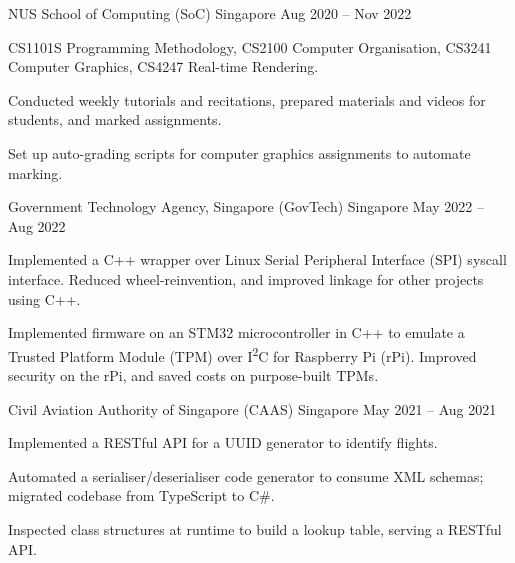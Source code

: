 \begin{cventries}
	{NUS School of Computing (SoC)} %
	{Singapore} %
	{Aug 2020 -- Nov 2022} %
	{
		\begin{cvitems} %
			\item CS1101S Programming Methodology, CS2100 Computer Organisation, CS3241 Computer Graphics, CS4247 Real-time Rendering.
			\item Conducted weekly tutorials and recitations, prepared materials and videos for students, and marked assignments.
			\item Set up auto-grading scripts for computer graphics assignments to automate marking.
		\end{cvitems}
	}



	{Government Technology Agency, Singapore (GovTech)} %
	{Singapore} %
	{May 2022 -- Aug 2022} %
	{
		\begin{cvitems} %
			\item Implemented a C++ wrapper over Linux Serial Peripheral Interface (SPI) syscall interface. Reduced wheel-reinvention, and improved linkage for other projects using C++.
			\item Implemented firmware on an STM32 microcontroller in C++ to emulate a Trusted Platform Module (TPM) over I\textsuperscript{2}C for Raspberry Pi (rPi). Improved security on the rPi, and saved costs on purpose-built TPMs.
		\end{cvitems}
	}


	{Civil Aviation Authority of Singapore (CAAS)} %
	{Singapore} %
	{May 2021 -- Aug 2021} %
	{
		\begin{cvitems} %
			\item Implemented a RESTful API for a UUID generator to identify flights.
			\item Automated a serialiser/deserialiser code generator to consume XML schemas; migrated codebase from TypeScript to C\#.
			\item Inspected class structures at runtime to build a lookup table, serving a RESTful API.\@
		\end{cvitems}
	}

\end{cventries}
